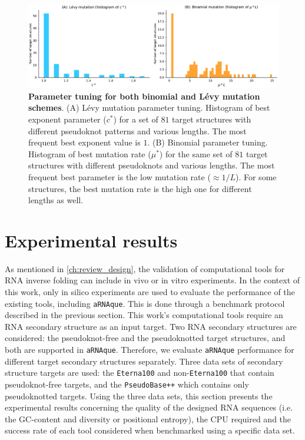 \begin{figure}[t!]
	\includegraphics[width=1.0 \linewidth]{../res/images/arnaque/fig3.pdf}
	\caption{\textbf{Parameter tuning for both binomial and Lévy mutation schemes}. (A) Lévy mutation parameter tuning. Histogram of best exponent parameter ($c^*$) for a set of $81$ target structures with different pseudoknot patterns and various lengths. The most frequent best exponent value is $1$. (B) Binomial parameter tuning. Histogram of best mutation rate ($\mu^*$) for the same set of $81$ target structures with different pseudoknots and various lengths. The most frequent best parameter is the low mutation rate ($\approx 1/L$). For some structures, the best mutation rate is the high one for different lengths as well.} \label{Fig:tunning}
\end{figure}
\section{Experimental results}
As mentioned in \autoref{ch:review_design}, the validation of computational tools for \ac{RNA} inverse folding can include in vivo or in vitro experiments. In the context of this work, only in silico experiments are used to evaluate the performance of the existing tools, including \texttt{aRNAque}. This is done through a benchmark protocol described in the previous section. This work's computational tools require an \ac{RNA} secondary structure as an input target. Two \ac{RNA} secondary structures are considered: the pseudoknot-free and the pseudoknotted target structures, and both are supported in \texttt{aRNAque}. Therefore, we evaluate \texttt{aRNAque} performance for different target secondary structures separately. Three data sets of secondary structure targets are used: the \texttt{Eterna100} and non-\texttt{Eterna100} that contain pseudoknot-free targets, and the \texttt{PseudoBase++} which contains only pseudoknotted targets. Using the three data sets, this section presents the experimental results concerning the quality of the designed \ac{RNA} sequences (i.e. the GC-content and diversity or positional entropy), the \ac{CPU} required and the success rate of each tool considered when benchmarked using a specific data set. 
